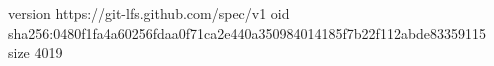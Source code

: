 version https://git-lfs.github.com/spec/v1
oid sha256:0480f1fa4a60256fdaa0f71ca2e440a350984014185f7b22f112abde83359115
size 4019
